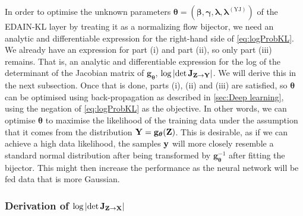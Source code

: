 \documentclass{statsmsc}
\begin{document}
{In order to optimise the unknown parameters
$\bm\theta=(\bm\beta, \bm\gamma, \bm\lambda, \bm\lambda^{(\textrm{YJ})})$ of the
\ac{EDAIN-KL} layer by treating it as a normalizing flow bijector, we need an analytic and
differentiable expression for the right-hand side of \cref{eq:logProbKL}. We already have
an expression for part (i) and part (ii), so only part  (iii) remains.
That is, an analytic and differentiable expression for
the log of the determinant of the Jacobian matrix of $\mathbf{g}_{\bm\theta}$, $\log\left|\det \mathbf{J}_{\mathbf{Z} \rightarrow {\mathbf{Y}}} \right|$. We will derive this
in the next subsection. Once that is done, parts (i), (ii) and (iii) are satisfied, so
$\bm\theta$ can be optimised using back-propagation as described in \cref{sec:Deep learning},
using the negation of \cref{eq:logProbKL} as the objective. In other words, we can optimise
$\bm\theta$ to maximise the likelihood of the training data under the assumption that it comes from
the distribution $\mathbf{Y}= \mathbf{g}_{\bm\theta}(\mathbf{Z})$. This is desirable, as if we can achieve
a high data likelihood, the samples $\mathbf{y}$ will more closely resemble a standard normal distribution
after being transformed by $\mathbf{g}_{\bm\theta}^{-1}$ after fitting the bijector.
This might then increase the performance as the neural network will be fed data
that is more Gaussian.

\subsubsection{Derivation
of %
$\log \left|\det \mathbf{J}_{\mathbf{Z} \rightarrow {\mathbf{X}}}\right|$}%
\label{ssub:ildj}

}
\end{document}
